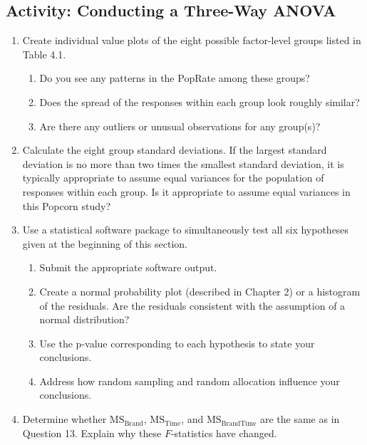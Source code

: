 \documentclass[
]{report}
\providecommand{\tightlist}{%
  \setlength{\itemsep}{0pt}\setlength{\parskip}{0pt}}
\begin{document}
\subsection{Activity: Conducting a Three-Way ANOVA}\label{activity-conducting-a-three-way-anova}

\begin{enumerate}
\def\labelenumi{\arabic{enumi}.}
\setcounter{enumi}{15}
\tightlist
\item
  Create individual value plots of the eight possible factor-level groups listed in Table 4.1.

  \begin{enumerate}
  \def\labelenumii{\alph{enumii}.}
  \tightlist
  \item
    Do you see any patterns in the PopRate among these groups?
  \item
    Does the spread of the responses within each group look roughly similar?
  \item
    Are there any outliers or unusual observations for any group(s)?
  \end{enumerate}
\item
  Calculate the eight group standard deviations. If the largest standard deviation is no more than two
  times the smallest standard deviation, it is typically appropriate to assume equal variances for the
  population of responses within each group. Is it appropriate to assume equal variances in this Popcorn
  study?
\item
  Use a statistical software package to simultaneously test all six hypotheses given at the beginning of
  this section.

  \begin{enumerate}
  \def\labelenumii{\alph{enumii}.}
  \tightlist
  \item
    Submit the appropriate software output.
  \item
    Create a normal probability plot (described in Chapter 2) or a histogram of the residuals. Are the
    residuals consistent with the assumption of a normal distribution?
  \item
    Use the p-value corresponding to each hypothesis to state your conclusions.
  \item
    Address how random sampling and random allocation influence your conclusions.
  \end{enumerate}
\item
  Determine whether \(\mathrm{MS}_{\mathrm{Brand}}\), \(\mathrm{MS}_{\mathrm{Time}}\), and \(\mathrm{MS}_{\mathrm{BrandTime}}\) are the same as in Question 13. Explain why these \(F\)-statistics have changed.
\end{enumerate}
\end{document}
